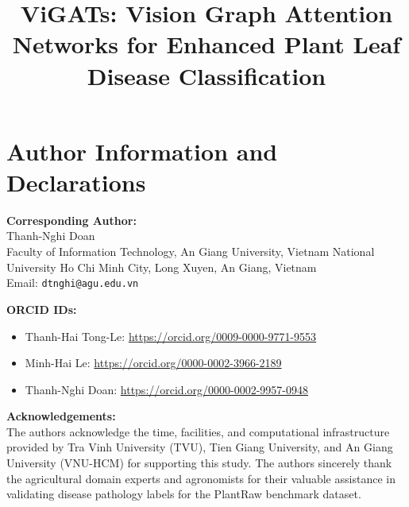 \documentclass[]{interact}
\begin{document}

\title{ViGATs: Vision Graph Attention Networks for Enhanced Plant Leaf Disease Classification}

\author{
}

\maketitle

\section*{Author Information and Declarations}

\textbf{Corresponding Author:} \\
Thanh-Nghi Doan \\
Faculty of Information Technology, An Giang University, Vietnam National University Ho Chi Minh City, Long Xuyen, An Giang, Vietnam \\
Email: \texttt{dtnghi@agu.edu.vn}

\vspace{0.5cm}
\textbf{ORCID IDs:}
\begin{itemize}
    \item Thanh-Hai Tong-Le: \url{https://orcid.org/0009-0000-9771-9553}
    \item Minh-Hai Le: \url{https://orcid.org/0000-0002-3966-2189}
    \item Thanh-Nghi Doan: \url{https://orcid.org/0000-0002-9957-0948}
\end{itemize}

\vspace{0.5cm}
\textbf{Acknowledgements:} \\
The authors acknowledge the time, facilities, and computational infrastructure provided by Tra Vinh University (TVU), Tien Giang University, and An Giang University (VNU-HCM) for supporting this study. The authors sincerely thank the agricultural domain experts and agronomists for their valuable assistance in validating disease pathology labels for the PlantRaw benchmark dataset.
\end{document}
